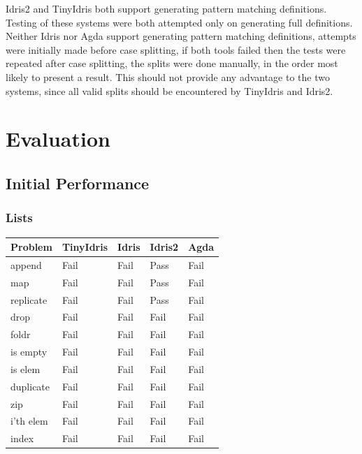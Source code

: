 \documentclass[a4paper]{article}
\begin{document}
Idris2 and TinyIdris both support generating
pattern matching definitions. Testing of these systems
were both attempted only on generating full definitions.
Neither Idris nor Agda support generating pattern matching
definitions, attempts were initially made before case splitting,
if both tools failed then the tests were repeated after
case splitting, the splits were done manually,
in the order most likely to present a result. This should not
provide any advantage to the two systems, since all valid splits
should be encountered by TinyIdris and Idris2.

\clearpage

\section{Evaluation}
\label{sec:org2fc5750}
\subsection{Initial Performance}
\label{sec:org9ac3710}

\subsubsection{Lists}
\label{sec:org840f301}
\begin{center}
\begin{tabular}{lllll}
Problem & TinyIdris & Idris & Idris2 & Agda\\
\hline
append & Fail & Fail & Pass & Fail\\
map & Fail & Fail & Pass & Fail\\
replicate & Fail & Fail & Pass & Fail\\
drop & Fail & Fail & Fail & Fail\\
foldr & Fail & Fail & Fail & Fail\\
is empty & Fail & Fail & Fail & Fail\\
is elem & Fail & Fail & Fail & Fail\\
duplicate & Fail & Fail & Fail & Fail\\
zip & Fail & Fail & Fail & Fail\\
i'th elem & Fail & Fail & Fail & Fail\\
index & Fail & Fail & Fail & Fail\\
\end{tabular}
\end{center}
\end{document}
